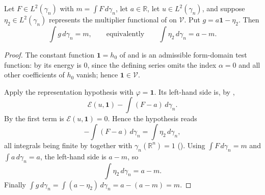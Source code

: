 \begin{lemma}
Let $F \in L^2(\gamma_n)$ with $m = \int F \, d\gamma_n$, let $a \in \mathbb{R}$,
let $u \in L^2(\gamma_n)$, and suppose
$\eta_2 \in L^2(\gamma_n)$ represents the multiplier functional of
 on $\mathcal{V}$.  Put $g = a\mathbf{1} - \eta_2$.
Then
\[
  \int g \, d\gamma_n = m ,
  \qquad\text{equivalently}\qquad
  \int \eta_2 \, d\gamma_n = a - m .
\]
\end{lemma}
\begin{proof}
The constant function $\mathbf{1} = h_0$ of  and
 is an admissible form-domain test function: by
 its energy is $0$, since the defining series omits the index
$\alpha = 0$ and all other coefficients of $h_0$ vanish; hence
$\mathbf{1} \in \mathcal{V}$.

Apply the representation hypothesis with $\varphi = \mathbf{1}$.  Its left-hand
side is, by ,
\[
  \mathcal{E}(u, \mathbf{1}) - \int (F - a)\, d\gamma_n .
\]
By  the first term is
$\mathcal{E}(u,\mathbf{1}) = 0$.  Hence the hypothesis reads
\[
  -\int (F-a)\, d\gamma_n = \int \eta_2 \, d\gamma_n ,
\]
all integrals being finite by  together with
$\gamma_n(\mathbb{R}^n) = 1$ ().  Using
$\int F \, d\gamma_n = m$ and $\int a \, d\gamma_n = a$, the left-hand side is
$a - m$, so
\[
  \int \eta_2 \, d\gamma_n = a - m .
\]
Finally $\int g \, d\gamma_n = \int (a - \eta_2)\, d\gamma_n = a - (a-m) = m$.
\end{proof}
